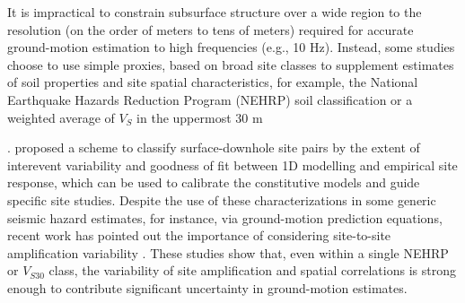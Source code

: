 It is impractical to constrain subsurface structure over a wide region to the resolution (on the order of meters to tens of meters) required for accurate ground-motion estimation to high frequencies (e.g., 10 Hz). Instead, some studies choose to use simple proxies, based on broad site classes to supplement estimates of soil properties and site spatial characteristics, for example, the National Earthquake Hazards Reduction Program (NEHRP) soil classification \citep{bssc2003NEHRPRecommended2003,akkarEmpiricalEquationsPrediction2010} or a weighted average of $V_S$ in the uppermost 30 m {\citep[$V_{S30}$, e.g., ][]{abrahamsonSummaryAbrahamsonSilva2008,idrissNGAWest2EmpiricalModel2014}. \citet{thompsonTaxonomySiteResponse2012} proposed a scheme to classify surface-downhole site pairs by the extent of interevent variability and goodness of fit between 1D modelling and empirical site response, which can be used to calibrate the constitutive models and guide specific site studies. Despite the use of these characterizations in some generic seismic hazard estimates, for instance, via ground-motion prediction equations, recent work has pointed out the importance of considering site-to-site amplification variability \citep{atkinsonEarthquakeGroundmotionPrediction2006,atikVariabilityGroundmotionPrediction2010}. These studies show that, even within a single NEHRP or $V_{S30}$ class, the variability of site amplification and spatial correlations is strong enough to contribute significant uncertainty in ground-motion estimates.

}
